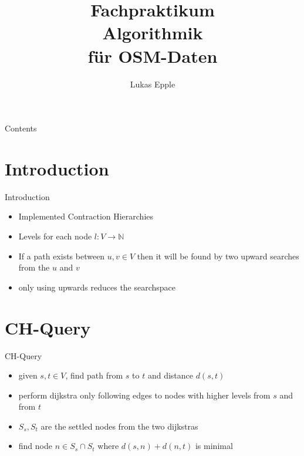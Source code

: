 \documentclass[8pt, t, aspectratio=169]{beamer}
\title{Fachpraktikum \\Algorithmik \\für OSM-Daten}
\author[Lukas Epple]{Lukas Epple}
\institute{Institut für Formale Methoden der Informatik (FMI), Universität Stuttgart}
\begin{document}
\begin{frame}[plain]
  \titlepage
\end{frame}
	    
		
\begin{frame}[plain]{Contents}
\tableofcontents
\end{frame}

\begin{huge}


\section{Introduction}
\begin{frame}{Introduction}
  \vfill
  \begin{itemize}
  \item Implemented Contraction Hierarchies
    \pause
    \item Levels for each node $l: V \rightarrow \mathbb{N}$
    \pause
    \item If a path exists between $u,v \in V$ then it will be found by two upward searches from the $u$ and $v$
    \pause
    \item only using upwards reduces the searchspace

  \end{itemize}
    
  \vfill
\end{frame}

\section{CH-Query}
\begin{frame}{CH-Query}
  \begin{itemize}
  \item given $s, t \in V$, find path from $s$ to $t$ and distance $d(s,t)$
    \pause
  \item perform dijkstra only following edges to nodes with higher levels from $s$ and from $t$
    \pause
  \item $S_s, S_t$ are the settled nodes from the two dijkstras
    \pause
  \item find node $n \in S_s \cap S_t$ where $d(s,n) + d(n, t)$ is minimal
  \end{itemize}
\end{frame}


\end{huge}
\end{document}
